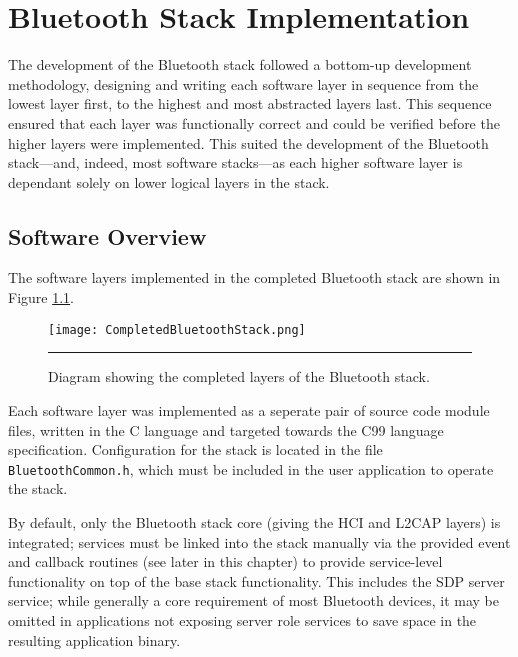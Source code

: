 \chapter{Bluetooth Stack Implementation}
\label{chp:btstackimp}

The development of the Bluetooth stack followed a bottom-up development methodology, designing and writing each software layer in sequence from the lowest layer first, to the highest and most abstracted layers last. This sequence ensured that each layer was functionally correct and could be verified before the higher layers were implemented. This suited the development of the Bluetooth stack---and, indeed, most software stacks---as each higher software layer is dependant solely on lower logical layers in the stack.

\section{Software Overview}

The software layers implemented in the completed Bluetooth stack are shown in Figure \ref{fig:completedbtstacklayers}.

\begin{figure}[tbph]
	\vspace{1em}
	\centering
		\texttt{[image: CompletedBluetoothStack.png]}
	\rule{35em}{0.5pt}
	\caption[Diagram of the completed Bluetooth stack layers]{Diagram showing the completed layers of the Bluetooth stack.}
	\label{fig:completedbtstacklayers}
\end{figure}

Each software layer was implemented as a seperate pair of source code module files, written in the C language and targeted towards the C99 language specification. Configuration for the stack is located in the file \texttt{BluetoothCommon.h}, which must be included in the user application to operate the stack.

By default, only the Bluetooth stack core (giving the HCI and L2CAP layers) is integrated; services must be linked into the stack manually via the provided event and callback routines (see later in this chapter) to provide service-level functionality on top of the base stack functionality. This includes the SDP server service; while generally a core requirement of most Bluetooth devices, it may be omitted in applications not exposing server role services to save space in the resulting application binary.

